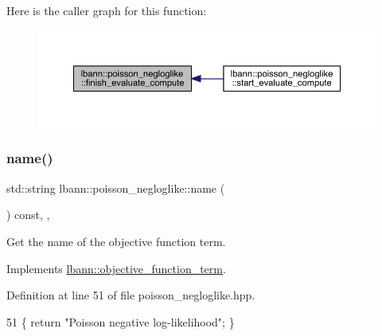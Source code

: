 Here is the caller graph for this function\+:\nopagebreak
\begin{figure}[H]
\begin{center}
\leavevmode
\includegraphics[width=350pt]{classlbann_1_1poisson__negloglike_a67c3cb239905fa9ee57369dddbbe76ed_icgraph}
\end{center}
\end{figure}
\mbox{\label{classlbann_1_1poisson__negloglike_ae5a73d52075578a3d0ed0b150a980741}} 
\subsubsection{\texorpdfstring{name()}{name()}}
{\footnotesize\ttfamily std\+::string lbann\+::poisson\+\_\+negloglike\+::name (\begin{DoxyParamCaption}{ }\end{DoxyParamCaption}) const\hspace{0.3cm}{\ttfamily [inline]}, {\ttfamily [override]}, {\ttfamily [virtual]}}

Get the name of the objective function term. 

Implements \hyperlink{classlbann_1_1objective__function__term_a964fbfad3dd0434aa8f32c5fedf1079a}{lbann\+::objective\+\_\+function\+\_\+term}.



Definition at line 51 of file poisson\+\_\+negloglike.\+hpp.


\begin{DoxyCode}
51 \{ \textcolor{keywordflow}{return} \textcolor{stringliteral}{"Poisson negative log-likelihood"}; \}
\end{DoxyCode}
\mbox{\label{classlbann_1_1poisson__negloglike_a1a4e084da868ff7e353f842662dd5e9a}} 
